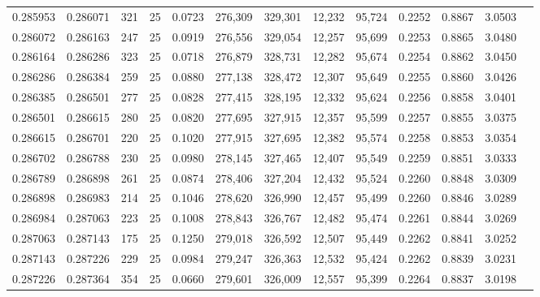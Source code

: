 \begin{tabular}{rrrrrrrrrrrrr}
0.285953 & 0.286071 &   321 &  25 &                                     0.0723 & 276,309 & 329,301 &  12,232 &  95,724 & 0.2252 & 0.8867 & 3.0503 \\
0.286072 & 0.286163 &   247 &  25 &                                     0.0919 & 276,556 & 329,054 &  12,257 &  95,699 & 0.2253 & 0.8865 & 3.0480 \\
0.286164 & 0.286286 &   323 &  25 &                                     0.0718 & 276,879 & 328,731 &  12,282 &  95,674 & 0.2254 & 0.8862 & 3.0450 \\
0.286286 & 0.286384 &   259 &  25 &                                     0.0880 & 277,138 & 328,472 &  12,307 &  95,649 & 0.2255 & 0.8860 & 3.0426 \\
0.286385 & 0.286501 &   277 &  25 &                                     0.0828 & 277,415 & 328,195 &  12,332 &  95,624 & 0.2256 & 0.8858 & 3.0401 \\
0.286501 & 0.286615 &   280 &  25 &                                     0.0820 & 277,695 & 327,915 &  12,357 &  95,599 & 0.2257 & 0.8855 & 3.0375 \\
0.286615 & 0.286701 &   220 &  25 &                                     0.1020 & 277,915 & 327,695 &  12,382 &  95,574 & 0.2258 & 0.8853 & 3.0354 \\
0.286702 & 0.286788 &   230 &  25 &                                     0.0980 & 278,145 & 327,465 &  12,407 &  95,549 & 0.2259 & 0.8851 & 3.0333 \\
0.286789 & 0.286898 &   261 &  25 &                                     0.0874 & 278,406 & 327,204 &  12,432 &  95,524 & 0.2260 & 0.8848 & 3.0309 \\
0.286898 & 0.286983 &   214 &  25 &                                     0.1046 & 278,620 & 326,990 &  12,457 &  95,499 & 0.2260 & 0.8846 & 3.0289 \\
0.286984 & 0.287063 &   223 &  25 &                                     0.1008 & 278,843 & 326,767 &  12,482 &  95,474 & 0.2261 & 0.8844 & 3.0269 \\
0.287063 & 0.287143 &   175 &  25 &                                     0.1250 & 279,018 & 326,592 &  12,507 &  95,449 & 0.2262 & 0.8841 & 3.0252 \\
0.287143 & 0.287226 &   229 &  25 &                                     0.0984 & 279,247 & 326,363 &  12,532 &  95,424 & 0.2262 & 0.8839 & 3.0231 \\
0.287226 & 0.287364 &   354 &  25 &                                     0.0660 & 279,601 & 326,009 &  12,557 &  95,399 & 0.2264 & 0.8837 & 3.0198 \\

\end{tabular}
